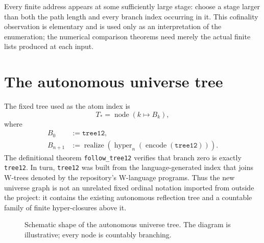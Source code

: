 \documentclass[11pt]{article}
\theoremstyle{definition}
\theoremstyle{remark}
\begin{document}
Every finite address appears at some sufficiently large stage: choose a stage
larger than both the path length and every branch index occurring in it.  This
cofinality observation is elementary and is used only as an interpretation of
the enumeration; the numerical comparison theorems need merely the actual
finite lists produced at each input.

\section{The autonomous universe tree}
\label{sec:autonomous-tree}

The fixed tree used as the atom index is
\[
 T_{\!*}=\operatorname{node}(k\mapsto B_k),
\]
where
\begin{align*}
 B_0 &:= \texttt{tree12},\\
 B_{n+1} &:= \operatorname{realize}\!\left(
     \operatorname{hyper}_n(\operatorname{encode}(\texttt{tree12}))
   \right).
\end{align*}
The definitional theorem \texttt{follow\_tree12} verifies that branch zero is
exactly \texttt{tree12}.  In turn, \texttt{tree12} was built from the
language-generated index that joins W-trees denoted by the repository's
W-language programs.  Thus the new universe graph is not an unrelated fixed
ordinal notation imported from outside the project: it contains the existing
autonomous reflection tree and a countable family of finite hyper-closures
above it.

\begin{figure}[ht]
\centering
{}
\caption{Schematic shape of the autonomous universe tree.  The diagram is
illustrative; every node is countably branching.}
\label{fig:tree}
\end{figure}
\end{document}
